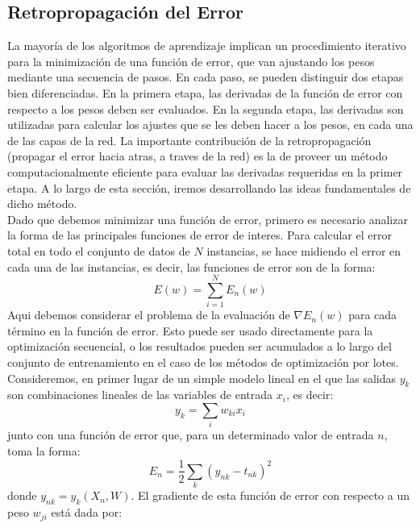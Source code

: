 \documentclass[a4paper,11pt,spanish]{book}
\begin{document}
      \subsection{Retropropagación del Error} \label{sec:backpropagation}
	La mayoría de los algoritmos de aprendizaje implican un procedimiento iterativo para la minimización de una función de error, que van ajustando los pesos mediante 
	una secuencia de pasos. En cada paso, se pueden distinguir dos etapas bien diferenciadas. En la primera etapa, las derivadas de la función de error con 
	respecto a los pesos deben ser evaluados. En la segunda etapa, las derivadas son utilizadas para calcular los ajustes que se les deben hacer a los pesos, en cada una 
	de las capas de la red. La importante contribución de la retropropagación (propagar el error hacia atras, a traves de la red) es la de proveer un 
	método computacionalmente eficiente para evaluar las derivadas requeridas en la primer etapa. A lo largo de esta sección, iremos desarrollando las ideas fundamentales de dicho
	método.\\
	Dado que debemos minimizar una función de error, primero es necesario analizar la forma de las principales funciones de error de interes. 
	Para calcular el error total en todo el conjunto de datos de $N$ instancias, se hace midiendo el error en cada una de las instancias, es decir, las funciones de error 
	son de la forma:
	\begin{equation*}
	  E(w) = \sum_{i=1}^N E_n(w)
	\end{equation*}
	Aqui debemos considerar el problema de la evaluación de $\nabla E_n(w)$ para cada término en la función de error. Esto puede ser usado directamente para la optimización secuencial, 
	o los resultados pueden ser acumulados a lo largo  del conjunto de entrenamiento en el caso de los métodos de optimización por lotes.\\
	\iffalse
	Consideremos, en primer lugar de un simple modelo lineal en el que las salidas $y_k$ son combinaciones lineales de las variables de entrada $x_i$, es decir:
	\begin{equation*}
	  y_k = \sum_i w_{ki} x_i
	\end{equation*}
	junto con una función de error que, para un determinado valor de entrada $n$, toma la forma:
	\begin{equation*}
	  E_n = \frac{1}{2} \sum_k (y_{nk}-t_{nk})^2
	\end{equation*}
	donde $y_{nk} = y_{k} (X_n , W)$. El gradiente de esta función de error con respecto a un peso $w_{ji}$ está dada por:
\end{document}
